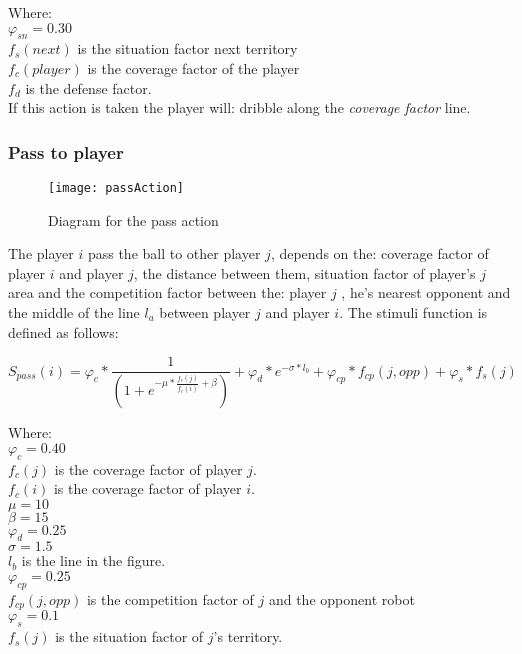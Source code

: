 \documentclass[
10pt, %
a4paper, %
oneside, %
headinclude,footinclude, %
BCOR5mm, %
]{scrartcl}
\begin{document}
Where:\\
$\varphi_{sn} = 0.30$ \\
$f_{s}(next)$ is the situation factor next territory \\
$f_{c}(player)$ is the coverage factor of the player\\
$f_{d}$ is  the defense factor.\\

If this action is taken the player will: dribble along the \textit{coverage factor} line.

\subsubsection{Pass to player}

\begin{figure}
	\centering
	\texttt{[image: passAction]}
	\caption{Diagram for the pass action}
	\label{fig:fig}
\end{figure}

The player $i$ pass the ball to other player $j$, depends on the: coverage factor of player $i$ and player $j$, the distance between them, situation factor of player's $j$ area and the competition factor between the: player $j$ , he's nearest opponent and the middle of the line $l_a$ between player $j$ and player $i$. The stimuli function is defined as follows:

\begin{equation}
	S_{pass}(i) = \varphi_c * \frac{1}{(1 + e^{- \mu * \frac{f_{c}(j)}{f_{c}(i)} + \beta})} +  \varphi_d * e^{-\sigma * l_b} + \varphi_{cp} * f_{cp}(j,opp) + \varphi_{s} * f_{s}(j)
\end{equation}

Where:\\
$\varphi_c = 0.40$ \\
$f_{c}(j)$ is the coverage factor of player $j$.\\
$f_{c}(i)$ is the coverage factor of player $i$.\\
$\mu = 10$\\
$\beta = 15$\\
$\varphi_d = 0.25$ \\
$\sigma = 1.5$\\
$l_b$ is the line in the figure. \\
$\varphi_{cp} = 0.25$\\
$f_{cp}(j,opp)$ is the competition factor of $j$ and the opponent robot\\
$\varphi_{s} = 0.1$\\
$f_{s}(j)$ is the situation factor of $j$'s territory.\\
\end{document}
